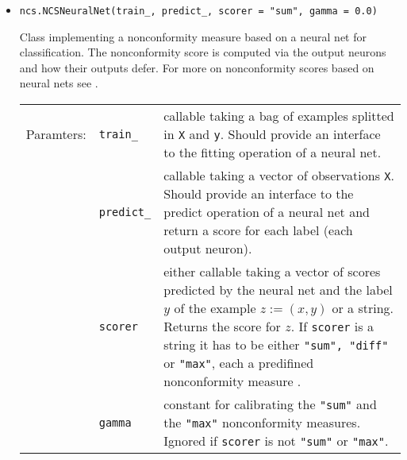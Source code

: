 \documentclass[twoside,11pt]{article}
\def\wo{~\\}
\begin{document}
\begin{appendices}
\begin{itemize}

        \item
          \texttt{ncs.NCSNeuralNet(train\_, predict\_,
            scorer = "sum", gamma = 0.0)}

          Class implementing a nonconformity measure based
          on a neural net for classification.
          The nonconformity score is computed via the
          output neurons and how their outputs defer.
          For more on nonconformity scores based on neural
          nets see \citet[see][Chapter 4]
          {papadopoulos_et_al_2007,alrw}.
          \\

          \begin{tabu}{llX}
            Paramters: &\texttt{train\_}
                       &callable taking a bag of examples
                        splitted in \texttt{X} and
                        \texttt{y}. Should provide an
                        interface to the fitting operation
                        of a neural net.
                        \\
                       &\texttt{predict\_}
                       &callable taking a vector of
                        observations \texttt{X}. Should
                        provide an interface to the
                        predict operation of a neural net
                        and return a score for each label
                        (each output neuron).
                        \\
                       &\texttt{scorer}
                       &either callable taking a vector of
                        scores predicted by the neural
                        net and the label $y$ of the
                        example $z := (x,y)$ or a string.
                        Returns the score for $z$.
                        If \texttt{scorer} is a string it
                        has to be either \texttt{"sum",
                        "diff"} or \texttt{"max"}, each a
                        predifined nonconformity measure
                        \citep[see][Chapter 4]
                        {papadopoulos_et_al_2007,alrw}.
                        \\
                       &\texttt{gamma}
                       &constant for calibrating the
                        \texttt{"sum"} and the
                        \texttt{"max"} nonconformity
                        measures.
                        Ignored if \texttt{scorer} is not
                        \texttt{"sum"} or \texttt{"max"}.
                        \\
          \end{tabu}
          \wo


\end{itemize}
\end{appendices}
\end{document}
